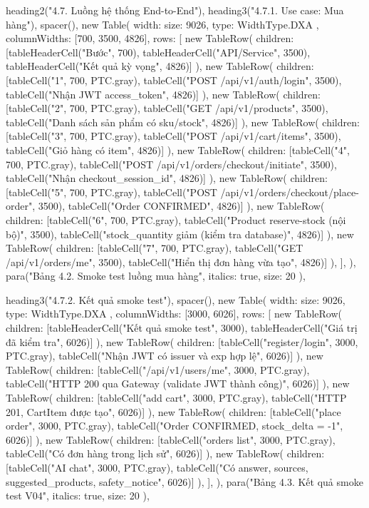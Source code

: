 {{{  heading2("4.7. Luồng hệ thống End-to-End"),
  heading3("4.7.1. Use case: Mua hàng"),
  spacer(),
  new Table({
    width: { size: 9026, type: WidthType.DXA },
    columnWidths: [700, 3500, 4826],
    rows: [
      new TableRow({ children: [tableHeaderCell("Bước", 700), tableHeaderCell("API/Service", 3500), tableHeaderCell("Kết quả kỳ vọng", 4826)] }),
      new TableRow({ children: [tableCell("1", 700, PTC.gray), tableCell("POST /api/v1/auth/login", 3500), tableCell("Nhận JWT access_token", 4826)] }),
      new TableRow({ children: [tableCell("2", 700, PTC.gray), tableCell("GET /api/v1/products", 3500), tableCell("Danh sách sản phẩm có sku/stock", 4826)] }),
      new TableRow({ children: [tableCell("3", 700, PTC.gray), tableCell("POST /api/v1/cart/items", 3500), tableCell("Giỏ hàng có item", 4826)] }),
      new TableRow({ children: [tableCell("4", 700, PTC.gray), tableCell("POST /api/v1/orders/checkout/initiate", 3500), tableCell("Nhận checkout_session_id", 4826)] }),
      new TableRow({ children: [tableCell("5", 700, PTC.gray), tableCell("POST /api/v1/orders/checkout/place-order", 3500), tableCell("Order CONFIRMED", 4826)] }),
      new TableRow({ children: [tableCell("6", 700, PTC.gray), tableCell("Product reserve-stock (nội bộ)", 3500), tableCell("stock_quantity giảm (kiểm tra database)", 4826)] }),
      new TableRow({ children: [tableCell("7", 700, PTC.gray), tableCell("GET /api/v1/orders/me", 3500), tableCell("Hiển thị đơn hàng vừa tạo", 4826)] }),
    ],
  }),
  para("Bảng 4.2. Smoke test luồng mua hàng", { italics: true, size: 20 }),

  heading3("4.7.2. Kết quả smoke test"),
  spacer(),
  new Table({
    width: { size: 9026, type: WidthType.DXA },
    columnWidths: [3000, 6026],
    rows: [
      new TableRow({ children: [tableHeaderCell("Kết quả smoke test", 3000), tableHeaderCell("Giá trị đã kiểm tra", 6026)] }),
      new TableRow({ children: [tableCell("register/login", 3000, PTC.gray), tableCell("Nhận JWT có issuer và exp hợp lệ", 6026)] }),
      new TableRow({ children: [tableCell("/api/v1/users/me", 3000, PTC.gray), tableCell("HTTP 200 qua Gateway (validate JWT thành công)", 6026)] }),
      new TableRow({ children: [tableCell("add cart", 3000, PTC.gray), tableCell("HTTP 201, CartItem được tạo", 6026)] }),
      new TableRow({ children: [tableCell("place order", 3000, PTC.gray), tableCell("Order CONFIRMED, stock_delta = -1", 6026)] }),
      new TableRow({ children: [tableCell("orders list", 3000, PTC.gray), tableCell("Có đơn hàng trong lịch sử", 6026)] }),
      new TableRow({ children: [tableCell("AI chat", 3000, PTC.gray), tableCell("Có answer, sources, suggested_products, safety_notice", 6026)] }),
    ],
  }),
  para("Bảng 4.3. Kết quả smoke test V04", { italics: true, size: 20 }),

}}}

